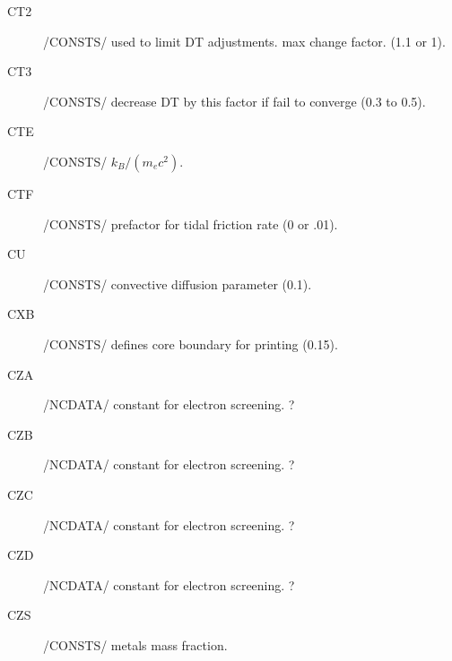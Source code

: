 \documentclass{article}
\begin{document}
\begin{description}
	\item[CT2]		    /CONSTS/ used to limit DT adjustments.  max change factor. (1.1 or 1).

	\item[CT3]		    /CONSTS/ decrease DT by this factor if fail to converge (0.3 to 0.5).

	\item[CTE]     	/CONSTS/ $k_B/(m_e c^2)$.

	\item[CTF]		    /CONSTS/ prefactor for tidal friction rate (0 or .01).

	\item[CU]		    /CONSTS/ convective diffusion parameter (0.1).

	\item[CXB]		    /CONSTS/ defines core boundary for printing (0.15).

	\item[CZA]		    /NCDATA/ constant for electron screening.  ?

	\item[CZB]	    /NCDATA/ constant for electron screening.  ?

	\item[CZC	]	    /NCDATA/ constant for electron screening.  ?

	\item[CZD	]	    /NCDATA/ constant for electron screening.  ?

	\item[CZS	]	    /CONSTS/ metals mass fraction.

\end{description}
\end{document}
